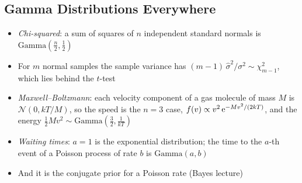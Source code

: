 \begin{slide}
\section[-1]{Gamma Distributions Everywhere}

\begin{PauseHighLight}
  \begin{itemize}
  \item \emph{Chi-squared}: a sum of squares of $n$ independent standard
    normals is $\mathrm{Gamma}(\frac{n}{2},\frac12)$\pause
  \item For $m$ normal samples the sample variance has
    $(m-1)\,\hat{\sigma}^2/\sigma^2\sim\chi^2_{m-1}$, which lies behind the
    $t$-test\pause
  \item \emph{Maxwell--Boltzmann}: each velocity component of a gas
    molecule of mass $M$ is $\mathcal{N}(0, kT/M)$, so the speed is the
    $n=3$ case, $f(v)\propto v^2\,{\rm e}^{-Mv^2/(2kT)}$, and the energy
    $\frac12 Mv^2\sim\mathrm{Gamma}(\frac32, \frac{1}{kT})$\pause
  \item \emph{Waiting times}: $a=1$ is the exponential distribution; the
    time to the $a$-th event of a Poisson process of rate
    $b$ is $\mathrm{Gamma}(a,b)$\pause
  \item And it is the conjugate prior for a Poisson rate (Bayes
    lecture)\pause
  \end{itemize}
\end{PauseHighLight}

\end{slide}


